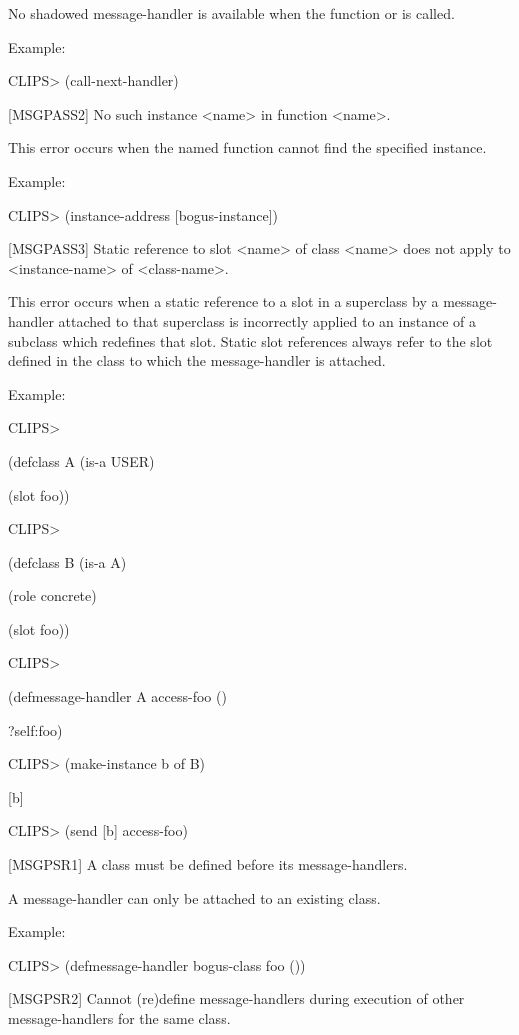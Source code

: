 \documentclass[letterpaper,10pt,english]{sphinxmanual}
\begin{document}
No shadowed message-handler is available when the function
 or  is called.

Example:

CLIPS\textgreater{} (call-next-handler)

{[}MSGPASS2{]} No such instance \textless{}name\textgreater{} in function \textless{}name\textgreater{}.

This error occurs when the named function cannot find the specified
instance.

Example:

CLIPS\textgreater{} (instance-address {[}bogus-instance{]})

{[}MSGPASS3{]} Static reference to slot \textless{}name\textgreater{} of class \textless{}name\textgreater{} does not
apply to \textless{}instance-name\textgreater{} of \textless{}class-name\textgreater{}.

This error occurs when a static reference to a slot in a superclass by a
message-handler attached to that superclass is incorrectly applied to an
instance of a subclass which redefines that slot. Static slot references
always refer to the slot defined in the class to which the
message-handler is attached.

Example:

CLIPS\textgreater{}

(defclass A (is-a USER)

(slot foo))

CLIPS\textgreater{}

(defclass B (is-a A)

(role concrete)

(slot foo))

CLIPS\textgreater{}

(defmessage-handler A access-foo ()

?self:foo)

CLIPS\textgreater{} (make-instance b of B)

{[}b{]}

CLIPS\textgreater{} (send {[}b{]} access-foo)

{[}MSGPSR1{]} A class must be defined before its message-handlers.

A message-handler can only be attached to an existing class.

Example:

CLIPS\textgreater{} (defmessage-handler bogus-class foo ())

{[}MSGPSR2{]} Cannot (re)define message-handlers during execution of other
message-handlers for the same class.
\end{document}
